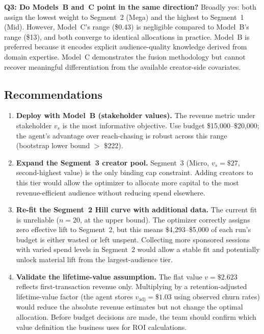 \documentclass[11pt,letterpaper]{article}
\begin{document}
\textbf{Q3: Do Models~B and~C point in the same direction?}
Broadly yes: both assign the lowest weight to Segment~2 (Mega) and the
highest to Segment~1 (Mid). However, Model~C's range (\$0.43) is negligible
compared to Model~B's range (\$13), and both converge to identical allocations
in practice. Model~B is preferred because it encodes explicit audience-quality
knowledge derived from domain expertise. Model~C demonstrates the fusion
methodology but cannot recover meaningful differentiation from the available
creator-side covariates.

\subsection{Recommendations}

\begin{enumerate}[nosep, leftmargin=1.5em]

  \item \textbf{Deploy with Model~B (stakeholder values).} The revenue metric
  under stakeholder $v_s$ is the most informative objective. Use budget
  \$15{,}000--\$20{,}000; the agent's advantage over reach-chasing is robust
  across this range (bootstrap lower bound $>$ \$222).

  \item \textbf{Expand the Segment~3 creator pool.} Segment~3 (Micro,
  $v_s = \$27$, second-highest value) is the only binding cap constraint.
  Adding creators to this tier would allow the optimizer to allocate more
  capital to the most revenue-efficient audience without reducing spend
  elsewhere.

  \item \textbf{Re-fit the Segment~2 Hill curve with additional data.}
  The current fit is unreliable ($n = 20$, at the upper bound). The optimizer
  correctly assigns zero effective lift to Segment~2, but this means
  \$4{,}293--\$5{,}000 of each run's budget is either wasted or left unspent.
  Collecting more sponsored sessions with varied spend levels in Segment~2
  would allow a stable fit and potentially unlock material lift from the
  largest-audience tier.

  \item \textbf{Validate the lifetime-value assumption.} The flat value
  $v = \$2.623$ reflects first-transaction revenue only. Multiplying by a
  retention-adjusted lifetime-value factor (the agent stores
  $v_\text{adj} = \$1.03$ using observed churn rates) would reduce the
  absolute revenue estimates but not change the optimal allocation. Before
  budget decisions are made, the team should confirm which value definition
  the business uses for ROI calculations.


\end{enumerate}
\end{document}
